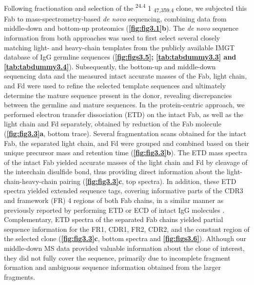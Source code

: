 Following fractionation and selection of the \textsuperscript{24.4} 1 \textsubscript{47,359.4} clone, we subjected this Fab to mass-spectrometry-based \emph{de novo} sequencing, combining data from middle-down and bottom-up proteomics (\textbf{\autoref{fig:fig3.1}b}). The \emph{de novo} sequence information from both approaches was used to first select several closely matching light- and heavy-chain templates from the publicly available IMGT database of IgG germline sequences (\textbf{\autoref{fig:figs3.5}; \autoref{tab:tabdummy3.3} and \autoref{tab:tabdummy3.4}}). Subsequently, the bottom-up and middle-down sequencing data and the measured intact accurate masses of the Fab, light chain, and Fd were used to refine the selected template sequences and ultimately determine the mature sequence present in the donor, revealing discrepancies between the germline and mature sequences.
In the protein-centric approach, we performed electron transfer dissociation (ETD) on the intact Fab, as well as the light chain and Fd separately, obtained by reduction of the Fab molecule (\textbf{\autoref{fig:fig3.3}a}, bottom trace). Several fragmentation scans obtained for the intact Fab, the separated light chain, and Fd were grouped and combined based on their unique precursor mass and retention time (\textbf{\autoref{fig:fig3.3}b}). The ETD mass spectra of the intact Fab yielded accurate masses of the light chain and Fd by cleavage of the interchain disulfide bond, thus providing direct information about the light-chain-heavy-chain pairing (\textbf{\autoref{fig:fig3.3}c}, top spectra). In addition, these ETD spectra yielded extended sequence tags, covering informative parts of the CDR3 and framework (FR) 4 regions of both Fab chains, in a similar manner as previously reported by performing ETD or ECD of intact IgG molecules \cite{boer2020selectivity, fornelli2017top-down, shaw2020direct}. Complementary, ETD spectra of the separated Fab chains yielded partial sequence information for the FR1, CDR1, FR2, CDR2, and the constant region of the selected clone (\textbf{\autoref{fig:fig3.3}c}, bottom spectra and \textbf{\autoref{fig:figs3.6}}). Although our middle-down MS data provided valuable information about the clone of interest, they did not fully cover the sequence, primarily due to incomplete fragment formation and ambiguous sequence information obtained from the larger fragments.
